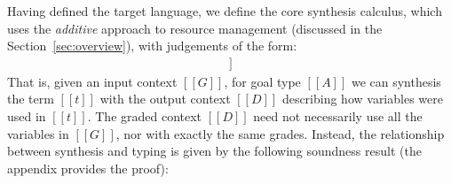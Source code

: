 Having defined the target language, we define the core
synthesis calculus, which uses the \emph{additive} approach
to resource management (discussed in the Section~\ref{sec:overview}),
with judgements of the form:
%
\begin{align*}
[[ G |- A =>+ t ; D ]]
\end{align*}
%
That is, given an input context $[[ G ]]$, for goal type $[[ A ]]$
we can synthesis the term $[[ t ]]$ with the output context $[[ D ]]$
describing how variables were used in $[[ t ]]$. The graded
context $[[ D ]]$ need not necessarily use all the variables in $[[ G ]]$,
nor with exactly the same grades. Instead, the relationship between
synthesis and typing is given by the following soundness result
(the appendix provides the proof):

